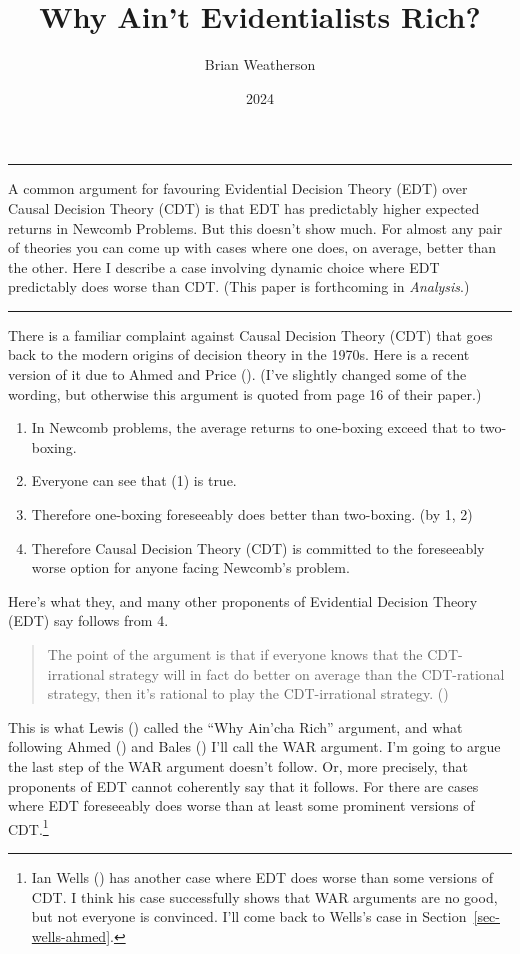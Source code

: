 \documentclass[
  10pt,
  letterpaper,
  DIV=11,
  numbers=noendperiod,
  twoside]{scrartcl}
\title{Why Ain't Evidentialists Rich?}
\author{Brian Weatherson}
\date{2024}
\providecommand{\tightlist}{%
  \setlength{\itemsep}{0pt}\setlength{\parskip}{0pt}}\usepackage{longtable,booktabs,array}
\renewenvironment{abstract}
 {\vspace{-1.25cm}
 \quotation\small\noindent\rule{\linewidth}{.5pt}\par\smallskip
 \noindent }
 {\par\noindent\rule{\linewidth}{.5pt}\endquotation}
\begin{document}
\maketitle
\begin{abstract}
A common argument for favouring Evidential Decision Theory (EDT) over
Causal Decision Theory (CDT) is that EDT has predictably higher expected
returns in Newcomb Problems. But this doesn't show much. For almost any
pair of theories you can come up with cases where one does, on average,
better than the other. Here I describe a case involving dynamic choice
where EDT predictably does worse than CDT. (This paper is forthcoming in
\emph{Analysis}.)
\end{abstract}

There is a familiar complaint against Causal Decision Theory (CDT) that
goes back to the modern origins of decision theory in the 1970s. Here is
a recent version of it due to Ahmed and Price
(). (I've slightly changed some of
the wording, but otherwise this argument is quoted from page 16 of their
paper.)

\begin{enumerate}
\def\labelenumi{\arabic{enumi}.}
\tightlist
\item
  In Newcomb problems, the average returns to one-boxing exceed that to
  two-boxing.
\item
  Everyone can see that (1) is true.
\item
  Therefore one-boxing foreseeably does better than two-boxing. (by 1,
  2)
\item
  Therefore Causal Decision Theory (CDT) is committed to the foreseeably
  worse option for anyone facing Newcomb's problem.
\end{enumerate}

Here's what they, and many other proponents of Evidential Decision
Theory (EDT) say follows from 4.

\begin{quote}
The point of the argument is that if everyone knows that the
CDT-irrational strategy will in fact do better on average than the
CDT-rational strategy, then it's rational to play the CDT-irrational
strategy. ()
\end{quote}

This is what Lewis () called the ``Why
Ain'cha Rich'' argument, and what following Ahmed
() and Bales
() I'll call the WAR argument. I'm going
to argue the last step of the WAR argument doesn't follow. Or, more
precisely, that proponents of EDT cannot coherently say that it follows.
For there are cases where EDT foreseeably does worse than at least some
prominent versions of CDT.\footnote{Ian Wells
  () has another case where EDT does worse
  than some versions of CDT. I think his case successfully shows that
  WAR arguments are no good, but not everyone is convinced. I'll come
  back to Wells's case in Section~\ref{sec-wells-ahmed}.}
\end{document}
